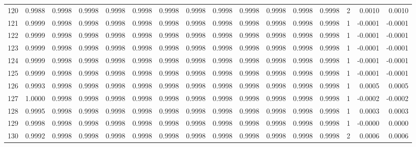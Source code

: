 \begin{tabular}{lrrrrrrrrrrrrrrr}
120 &      0.9988 &  0.9998 &  0.9998 &  0.9998 &  0.9998 &  0.9998 &  0.9998 &  0.9998 &  0.9998 &  0.9998 &   0.9998 &     0.9998 &      2 &                    0.0010 &                     0.0010 \\
121 &      0.9999 &  0.9998 &  0.9998 &  0.9998 &  0.9998 &  0.9998 &  0.9998 &  0.9998 &  0.9998 &  0.9998 &   0.9998 &     0.9998 &      1 &                   -0.0001 &                    -0.0001 \\
122 &      0.9999 &  0.9998 &  0.9998 &  0.9998 &  0.9998 &  0.9998 &  0.9998 &  0.9998 &  0.9998 &  0.9998 &   0.9998 &     0.9998 &      1 &                   -0.0001 &                    -0.0001 \\
123 &      0.9999 &  0.9998 &  0.9998 &  0.9998 &  0.9998 &  0.9998 &  0.9998 &  0.9998 &  0.9998 &  0.9998 &   0.9998 &     0.9998 &      1 &                   -0.0001 &                    -0.0001 \\
124 &      0.9999 &  0.9998 &  0.9998 &  0.9998 &  0.9998 &  0.9998 &  0.9998 &  0.9998 &  0.9998 &  0.9998 &   0.9998 &     0.9998 &      1 &                   -0.0001 &                    -0.0001 \\
125 &      0.9999 &  0.9998 &  0.9998 &  0.9998 &  0.9998 &  0.9998 &  0.9998 &  0.9998 &  0.9998 &  0.9998 &   0.9998 &     0.9998 &      1 &                   -0.0001 &                    -0.0001 \\
126 &      0.9993 &  0.9998 &  0.9998 &  0.9998 &  0.9998 &  0.9998 &  0.9998 &  0.9998 &  0.9998 &  0.9998 &   0.9998 &     0.9998 &      1 &                    0.0005 &                     0.0005 \\
127 &      1.0000 &  0.9998 &  0.9998 &  0.9998 &  0.9998 &  0.9998 &  0.9998 &  0.9998 &  0.9998 &  0.9998 &   0.9998 &     0.9998 &      1 &                   -0.0002 &                    -0.0002 \\
128 &      0.9995 &  0.9998 &  0.9998 &  0.9998 &  0.9998 &  0.9998 &  0.9998 &  0.9998 &  0.9998 &  0.9998 &   0.9998 &     0.9998 &      1 &                    0.0003 &                     0.0003 \\
129 &      0.9998 &  0.9998 &  0.9998 &  0.9998 &  0.9998 &  0.9998 &  0.9998 &  0.9998 &  0.9998 &  0.9998 &   0.9998 &     0.9998 &      1 &                   -0.0000 &                     0.0000 \\
130 &      0.9992 &  0.9998 &  0.9998 &  0.9998 &  0.9998 &  0.9998 &  0.9998 &  0.9998 &  0.9998 &  0.9998 &   0.9998 &     0.9998 &      2 &                    0.0006 &                     0.0006 \\

\end{tabular}
